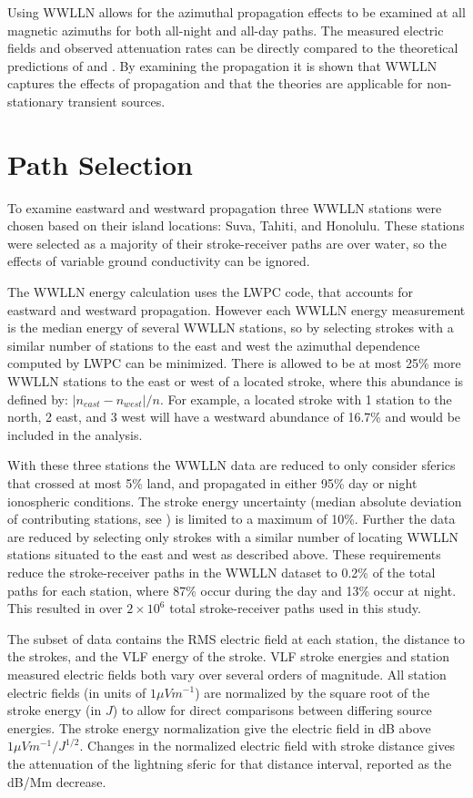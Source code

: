 \documentclass[draft,jgrga]{AGUTeX}
\begin{document}
\begin{article}
Using WWLLN allows for the azimuthal propagation effects to be examined at all magnetic azimuths for both all-night and all-day paths.
The measured electric fields and observed attenuation rates can be directly compared to the theoretical predictions of \citet{Wait1960a} and \citet{Taylor1960a}.
By examining the propagation it is shown that WWLLN captures the effects of propagation and that the theories are applicable for non-stationary transient sources.

\section{Path Selection}

To examine eastward and westward propagation three WWLLN stations were chosen based on their island locations: Suva, Tahiti, and Honolulu.
These stations were selected as a majority of their stroke-receiver paths are over water, so the effects of variable ground conductivity can be ignored. 

The WWLLN energy calculation uses the LWPC code, that accounts for eastward and westward propagation.
However each WWLLN energy measurement is the median energy of several WWLLN stations, so by selecting strokes with a similar number of stations to the east and west the azimuthal dependence computed by LWPC can be minimized.
There is allowed to be at most 25\% more WWLLN stations to the east or west of a located stroke, where this abundance is defined by: $|n_{east} - n_{west}| / n$.
For example, a located stroke with 1 station to the north, 2 east, and 3 west will have a westward abundance of 16.7\% and would be included in the analysis.

With these three stations the WWLLN data are reduced to only consider sferics that crossed at most 5\% land, and propagated in either 95\% day or night ionospheric conditions.
The stroke energy uncertainty (median absolute deviation of contributing stations, see \citet{Hutchins2012}) is limited to a maximum of 10\%.
Further the data are reduced by selecting only strokes with a similar number of locating WWLLN stations situated to the east and west as described above.
These requirements reduce the stroke-receiver paths in the WWLLN dataset to 0.2\% of the total paths for each station, where 87\% occur during the day and 13\% occur at night.
This resulted in over $2\times10^6$ total stroke-receiver paths used in this study.

The subset of data contains the RMS electric field at each station, the distance to the strokes, and the VLF energy of the stroke.
VLF stroke energies and station measured electric fields both vary over several orders of magnitude.
All station electric fields (in units of $1 \mu V m^{-1}$) are normalized by the square root of the stroke energy (in $J$) to allow for direct comparisons between differing source energies.
The stroke energy normalization give the electric field in dB above $1 \mu Vm^{-1}/J^{1/2}$.
Changes in the normalized electric field with stroke distance gives the attenuation of the lightning sferic for that distance interval, reported as the dB/Mm decrease. 


\end{article}
\end{document}
